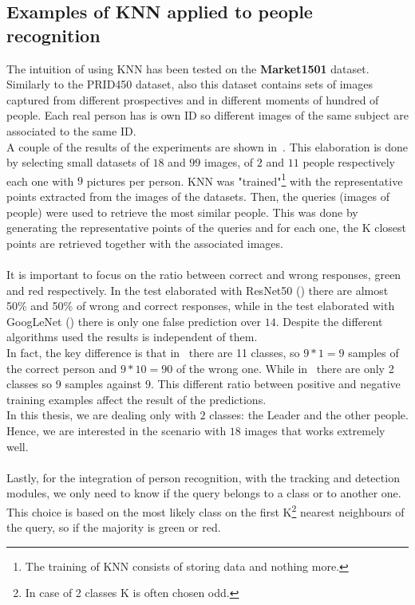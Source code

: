 \subsection{Examples of KNN applied to people recognition}
The intuition of using KNN has been tested on the \textbf{Market1501}\cite{market1501} dataset. Similarly to the PRID450 dataset, also this dataset contains sets of images captured from different prospectives and in different moments of hundred of people. Each real person has is own ID so different images of the same subject are associated to the same ID.\\
A couple of the results of the experiments are shown in~. This elaboration is done by selecting small datasets of $18$ and $99$ images, of $2$ and $11$ people respectively each one with $9$ pictures per person. KNN was "trained"\footnote{The training of KNN consists of storing data and nothing more.} with the representative points extracted from the images of the datasets. Then, the queries (images of people) were used to retrieve the most similar people. This was done by generating the representative points of the queries and for each one, the K closest points are retrieved together with the associated images.\\
\\
It is important to focus on the ratio between correct and wrong responses, green and red respectively. In the test elaborated with ResNet50 () there are almost 50\% and 50\% of wrong and correct responses, while in the test elaborated with GoogLeNet () there is only one false prediction over $14$. Despite the different algorithms used the results is independent of them.\\
In fact, the key difference is that in~ there are 11 classes, so $9*1=9$ samples of the correct person and $9*10=90$ of the wrong one. While in~ there are only 2 classes so $9$ samples against $9$. This different ratio between positive and negative training examples affect the result of the predictions.\\
In this thesis, we are dealing only with $2$ classes: the Leader and the other people. Hence, we are interested in the scenario with $18$ images that works extremely well.\\
\\
Lastly, for the integration of person recognition, with the tracking and detection modules, we only need to know if the query belongs to a class or to another one. This choice is based on the most likely class on the first K\footnote{In case of 2 classes K is often chosen odd.}  nearest neighbours of the query, so if the majority is green or red.

